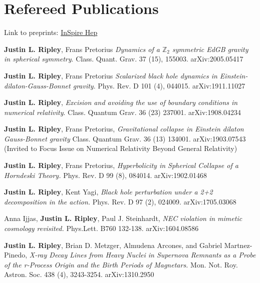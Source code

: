 \documentclass{my_cv}
\begin{document}
\section{Refereed Publications}
Link to preprints: \href{https://inspirehep.net/authors/1477964}{InSpire Hep}
\begin{etaremune}
\item {\bf Justin L. Ripley}, Frans Pretorius 
	\emph{Dynamics of a $\mathbb{Z}_2$ symmetric EdGB gravity in
	spherical symmetry}.
	Class. Quant. Grav. 37 (15), 155003.
	arXiv:2005.05417
\item {\bf Justin L. Ripley}, Frans Pretorius 
	\emph{Scalarized black hole dynamics in
	Einstein-dilaton-Gauss-Bonnet gravity}.
	Phys. Rev. D 101 (4), 044015.
	arXiv:1911.11027
\item {\bf Justin L. Ripley}, 
	\emph{Excision and avoiding the use of boundary conditions
	in numerical relativity}.
	Class. Quantum Grav. 36 (23) 237001.  
	arXiv:1908.04234
\item {\bf Justin L. Ripley}, Frans Pretorius, 
	\emph{Gravitational collapse in Einstein
	dilaton Gauss-Bonnet gravity}
	Class. Quantum Grav. 36 (13) 134001. arXiv:1903.07543
	(Invited to Focus Issue on Numerical
	Relativity Beyond General Relativity)
\item {\bf Justin L. Ripley}, Frans Pretorius, 
	\emph{Hyperbolicity in Spherical Collapse of a Horndeski Theory.}
	Phys. Rev. D 99 (8), 084014. arXiv:1902.01468
\item {\bf Justin L. Ripley}, Kent Yagi, 
	\emph{Black hole perturbation under a 2+2 decomposition
	in the action.}
	Phys. Rev. D 97 (2), 024009. arXiv:1705.03068
\item Anna Ijjas, {\bf Justin L. Ripley}, Paul J. Steinhardt,
	\emph{NEC violation in mimetic cosmology revisited.}
	Phys.Lett. B760 132-138. arXiv:1604.08586
\item {\bf Justin L. Ripley}, Brian D. Metzger,	
	Almudena Arcones, and Gabriel Martnez-Pinedo,
	\emph{X-ray Decay Lines from Heavy Nuclei in
	Supernova Remnants as a Probe of the r-Process Origin
	and the Birth Periods of Magnetars.}
	Mon. Not. Roy. Astron. Soc. 438 (4), 3243-3254.
	arXiv:1310.2950
\end{etaremune}
\end{document}

